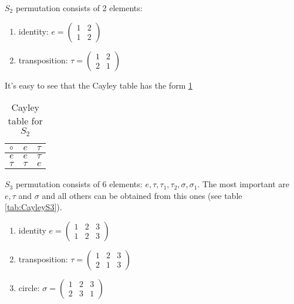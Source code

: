 \begin{appendices}
\begin{example}[$S_2$ group]
  $S_2$ permutation consists of 2 elements:
  \begin{enumerate}
  \item identity:
    \(
    e = \begin{pmatrix}
      1 & 2 \\
      1 & 2
    \end{pmatrix}
    \) 
  \item transposition:
    \(
    \tau = \begin{pmatrix}
      1 & 2 \\
      2 & 1
    \end{pmatrix}
    \) 
  \end{enumerate}
  It's easy to see that the Cayley table has the form \ref{tab:CayleyS2}
    \begin{table}
    \centering
    \caption{Cayley table for $S_2$}
    \label{tab:CayleyS2}
    \begin{tabular}{l|ll}
      \toprule
      $\circ$ & $e$ & $\tau$ \\
      \midrule
      $e$ & $e$ & $\tau$ \\
      $\tau$ & $\tau$ & $e$ \\
      \bottomrule
    \end{tabular}
    \end{table}
  \label{ex:s2group}
\end{example}

\begin{example}[$S_3$ group]
    $S_3$ permutation consists of 6 elements: $e, \tau, \tau_1, \tau_2,
    \sigma, \sigma_1$. The most important are $e, \tau$ and $\sigma$
    and all others can be obtained from this ones (see table
    \ref{tab:CayleyS3}).
  \begin{enumerate}
  \item identity
    \(
    e = \begin{pmatrix}
      1 & 2 & 3\\
      1 & 2 & 3
    \end{pmatrix}
    \) 
  \item transposition:
    \(
    \tau = \begin{pmatrix}
      1 & 2 & 3\\
      2 & 1 & 3
    \end{pmatrix}
    \) 
  \item circle:
    \(
    \sigma = \begin{pmatrix}
      1 & 2 & 3\\
      2 & 3 & 1
    \end{pmatrix}
    \) 
  \end{enumerate}


\end{example}
\end{appendices}
